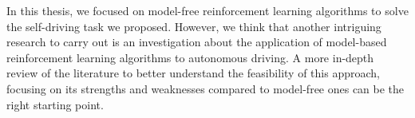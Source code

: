 In this thesis, we focused on model-free reinforcement learning algorithms to solve the self-driving task we proposed.
However, we think that another intriguing research to carry out is an investigation about the application of model-based reinforcement learning algorithms to autonomous driving.
A more in-depth review of the literature to better understand the feasibility of this approach, focusing on its strengths and weaknesses compared to model-free ones can be the right starting point.